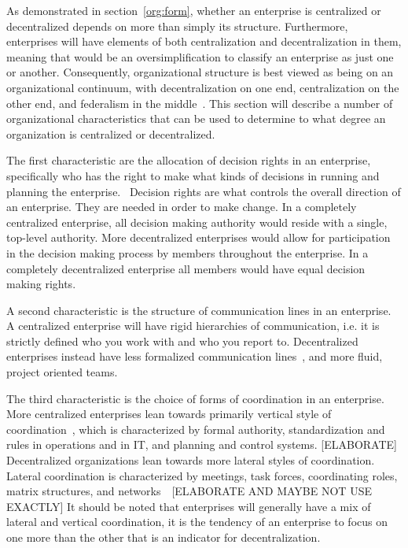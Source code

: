 As demonstrated in section~\ref{org:form}, whether an enterprise is centralized or decentralized depends on more than simply its structure. Furthermore, enterprises will have elements of both centralization and decentralization in them, meaning that would be an oversimplification to classify an enterprise as just one or another. Consequently, organizational structure is best viewed as being on an organizational continuum, with decentralization on one end, centralization on the other end, and federalism in the middle~\cite{pearlson2009}. This section will describe a number of organizational characteristics that can be used to determine to what degree an organization is centralized or decentralized. 

The first characteristic are the allocation of decision rights in an enterprise, specifically who has the right to make what kinds of decisions in running and planning the enterprise.~\cite{pearlson2009} Decision rights are what controls the overall direction of an enterprise. They are needed in order to make change. In a completely centralized enterprise, all decision making authority would reside with a single, top-level authority. More decentralized enterprises would allow for participation in the decision making process by members throughout the enterprise. In a completely decentralized enterprise all members would have equal decision making rights. 

A second characteristic is the structure of communication lines in an enterprise. A centralized enterprise will have rigid hierarchies of communication, i.e. it is strictly defined who you work with and who you report to. Decentralized enterprises instead have less formalized communication lines~\cite{pearlson2009}, and more fluid, project oriented teams.~\cite{Applegate1988a}

The third characteristic is the choice of forms of coordination in an enterprise. More centralized enterprises lean towards primarily vertical style of coordination~\cite{Bolman2008}, which is characterized by formal authority, standardization and rules in operations and in IT, and planning and control systems. [ELABORATE] Decentralized organizations lean towards more lateral styles of coordination. Lateral coordination is characterized by meetings, task forces, coordinating roles, matrix structures, and networks~~\cite{Bolman2008}[ELABORATE AND MAYBE NOT USE EXACTLY] It should be noted that enterprises will generally have a mix of lateral and vertical coordination, it is the tendency of an enterprise to focus on one more than the other that is an indicator for decentralization. 

